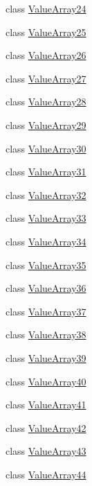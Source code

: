 \begin{DoxyCompactItemize}
class \hyperlink{classtesting_1_1internal_1_1ValueArray24}{\-Value\-Array24}
\item 
class \hyperlink{classtesting_1_1internal_1_1ValueArray25}{\-Value\-Array25}
\item 
class \hyperlink{classtesting_1_1internal_1_1ValueArray26}{\-Value\-Array26}
\item 
class \hyperlink{classtesting_1_1internal_1_1ValueArray27}{\-Value\-Array27}
\item 
class \hyperlink{classtesting_1_1internal_1_1ValueArray28}{\-Value\-Array28}
\item 
class \hyperlink{classtesting_1_1internal_1_1ValueArray29}{\-Value\-Array29}
\item 
class \hyperlink{classtesting_1_1internal_1_1ValueArray30}{\-Value\-Array30}
\item 
class \hyperlink{classtesting_1_1internal_1_1ValueArray31}{\-Value\-Array31}
\item 
class \hyperlink{classtesting_1_1internal_1_1ValueArray32}{\-Value\-Array32}
\item 
class \hyperlink{classtesting_1_1internal_1_1ValueArray33}{\-Value\-Array33}
\item 
class \hyperlink{classtesting_1_1internal_1_1ValueArray34}{\-Value\-Array34}
\item 
class \hyperlink{classtesting_1_1internal_1_1ValueArray35}{\-Value\-Array35}
\item 
class \hyperlink{classtesting_1_1internal_1_1ValueArray36}{\-Value\-Array36}
\item 
class \hyperlink{classtesting_1_1internal_1_1ValueArray37}{\-Value\-Array37}
\item 
class \hyperlink{classtesting_1_1internal_1_1ValueArray38}{\-Value\-Array38}
\item 
class \hyperlink{classtesting_1_1internal_1_1ValueArray39}{\-Value\-Array39}
\item 
class \hyperlink{classtesting_1_1internal_1_1ValueArray40}{\-Value\-Array40}
\item 
class \hyperlink{classtesting_1_1internal_1_1ValueArray41}{\-Value\-Array41}
\item 
class \hyperlink{classtesting_1_1internal_1_1ValueArray42}{\-Value\-Array42}
\item 
class \hyperlink{classtesting_1_1internal_1_1ValueArray43}{\-Value\-Array43}
\item 
class \hyperlink{classtesting_1_1internal_1_1ValueArray44}{\-Value\-Array44}
\item 

\end{DoxyCompactItemize}
